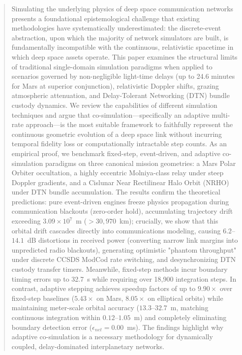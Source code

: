 \documentclass[a4paper,fleqn]{cas-sc}
\begin{document}
\begin{abstract}
Simulating the underlying physics of deep space communication networks presents a foundational epistemological challenge that existing methodologies have systematically underestimated: the discrete-event abstraction, upon which the majority of network simulators are built, is fundamentally incompatible with the continuous, relativistic spacetime in which deep space assets operate. This paper examines the structural limits of traditional single-domain simulation paradigms when applied to scenarios governed by non-negligible light-time delays (up to 24.6 minutes for Mars at superior conjunction), relativistic Doppler shifts, grazing atmospheric attenuation, and Delay-Tolerant Networking (DTN) bundle custody dynamics. We review the capabilities of different simulation techniques and argue that co-simulation---specifically an adaptive multi-rate approach---is the most suitable framework to faithfully represent the continuous geometric evolution of a deep space link without incurring temporal fidelity loss or computationally intractable step counts. As an empirical proof, we benchmark fixed-step, event-driven, and adaptive co-simulation paradigms on three canonical mission geometries: a Mars Polar Orbiter occultation, a highly eccentric Molniya-class relay under steep Doppler gradients, and a Cislunar Near Rectilinear Halo Orbit (NRHO) under DTN bundle accumulation. The results confirm the theoretical predictions: pure event-driven engines freeze physics propagation during communication blackouts (zero-order hold), accumulating trajectory drift exceeding $3.09 \times 10^7$~m ($>30,970$~km); crucially, we show that this orbital drift cascades directly into communications modeling, causing $6.2$--$14.1$~dB distortions in received power (converting narrow link margins into unpredicted radio blackouts), generating optimistic "phantom throughput" under discrete CCSDS ModCod rate switching, and desynchronizing DTN custody transfer timers. Meanwhile, fixed-step methods incur boundary timing errors up to 32.7~s while requiring over 18,900 integration steps. In contrast, adaptive stepping achieves speedup factors of up to $9.90\times$ over fixed-step baselines ($5.43\times$ on Mars, $8.05\times$ on elliptical orbits) while maintaining meter-scale orbital accuracy ($13.3$--$32.7$~m, matching continuous integration within $0.12$--$1.05$~m) and completely eliminating boundary detection error ($\epsilon_{net} = 0.00$~ms). The findings highlight why adaptive co-simulation is a necessary methodology for dynamically coupled, delay-dominated interplanetary networks.
\end{abstract}
\end{document}
